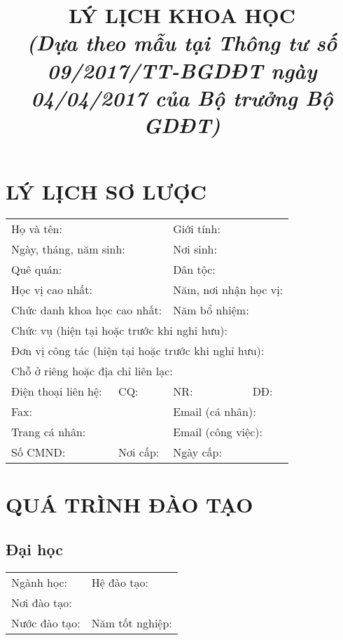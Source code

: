 \documentclass[a4paper, 11pt]{article}
\title{LÝ LỊCH KHOA HỌC \\ \tiny\emph{(Dựa theo mẫu tại Thông tư số 09/2017/TT-BGDĐT ngày 04/04/2017 của Bộ trưởng Bộ GDĐT)}}
\begin{document}
\pagestyle{empty}
\maketitle
\thispagestyle{empty}

\section{LÝ LỊCH SƠ LƯỢC}

\begin{tabularx}{\columnwidth}{XXXX}
\multicolumn{2}{l}{Họ và tên: } & \multicolumn{2}{l}{Giới tính: }\\
\multicolumn{2}{l}{Ngày, tháng, năm sinh: } & \multicolumn{2}{l}{Nơi sinh:} \\ 
\multicolumn{2}{l}{Quê quán:} & \multicolumn{2}{l}{Dân tộc:} \\
\multicolumn{2}{l}{Học vị cao nhất: } & \multicolumn{2}{l}{Năm, nơi nhận học vị: }\\
\multicolumn{2}{l}{Chức danh khoa học cao nhất: } & \multicolumn{2}{l}{Năm bổ nhiệm:} \\
\multicolumn{4}{l}{Chức vụ (hiện tại hoặc trước khi nghỉ hưu):} \\
\multicolumn{4}{l}{Đơn vị công tác (hiện tại hoặc trước khi nghỉ hưu):} \\
\multicolumn{4}{l}{Chỗ ở riêng hoặc địa chỉ liên lạc:} \\
Điện thoại liên hệ: & CQ: & NR: & DĐ: \\
\multicolumn{2}{l}{Fax:} & \multicolumn{2}{l}{Email (cá nhân): } \\
\multicolumn{2}{l}{Trang cá nhân: } & \multicolumn{2}{l}{Email (công việc):} \\
Số CMND: & Nơi cấp: & Ngày cấp: & \\
\end{tabularx}

\section{QUÁ TRÌNH ĐÀO TẠO}

\subsection{Đại học}

\begin{tabularx}{\columnwidth}{XX}
Ngành học:  & Hệ đào tạo: \\
\multicolumn{2}{l}{Nơi đào tạo: } \\
Nước đào tạo:  & Năm tốt nghiệp: \\
\end{tabularx}
\end{document}
